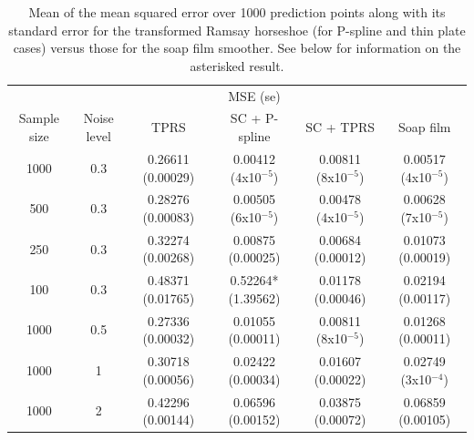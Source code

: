 \begin{table}[ht]
\begin{tabular}{c c c c c c}\\
& & & MSE (se) &\\
Sample size & Noise level & TPRS & SC + P-spline& SC + TPRS & Soap film\\
\hline
\hline
1000 & 0.3 & 0.26611 (0.00029) & 0.00412 (4x10$^{-5}$) & 0.00811 (8x10$^{-5}$) & 0.00517 (4x10$^{-5}$) \\ 
500 & 0.3 & 0.28276 (0.00083) & 0.00505 (6x10$^{-5}$) & 0.00478 (4x10$^{-5}$) & 0.00628 (7x10$^{-5}$) \\ 
250 & 0.3 & 0.32274 (0.00268) & 0.00875 (0.00025) & 0.00684 (0.00012) & 0.01073 (0.00019) \\ 
100 & 0.3 & 0.48371 (0.01765) & 0.52264* (1.39562) & 0.01178 (0.00046) & 0.02194 (0.00117) \\ 
1000 & 0.5 & 0.27336 (0.00032) & 0.01055 (0.00011) & 0.00811 (8x10$^{-5}$) & 0.01268 (0.00011) \\ 
1000 & 1 & 0.30718 (0.00056) & 0.02422 (0.00034) & 0.01607 (0.00022) & 0.02749 (3x10$^{-4}$) \\ 
1000 & 2 & 0.42296 (0.00144) & 0.06596 (0.00152) & 0.03875 (0.00072) & 0.06859 (0.00105) \\ 
\end{tabular}
\label{scramsayres}
\caption{Mean of the mean squared error over 1000 prediction points along with its standard error for the transformed Ramsay horseshoe (for P-spline and thin plate cases) versus those for the soap film smoother. See below for information on the asterisked result.}
\end{table}


